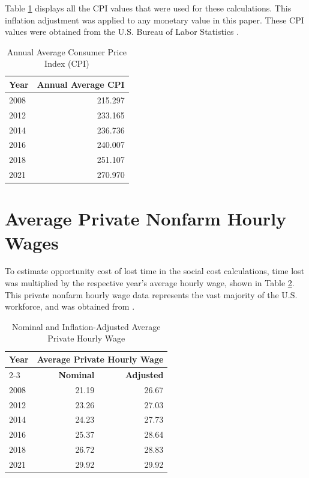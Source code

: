 Table \ref{tab:appendix_cpi} displays all the CPI values that were used for these calculations. This inflation adjustment was applied to any monetary value in this paper. These CPI values were obtained from the U.S. Bureau of Labor Statistics \cite{BLS_CPI, USInflationCalc_CPI}.

\begin{table}[ht]
\centering
\caption{Annual Average Consumer Price Index (CPI)}
\label{tab:appendix_cpi}
\begin{tabular}{lr}
\toprule
\textbf{Year} & \textbf{Annual Average CPI} \\
\midrule
2008 & 215.297 \\
2012 & 233.165 \\
2014 & 236.736 \\
2016 & 240.007 \\
2018 & 251.107 \\
2021 & 270.970 \\
\bottomrule
\end{tabular}
\end{table}

\section{Average Private Nonfarm Hourly Wages}
\label{app:hourly_wages}
To estimate opportunity cost of lost time in the social cost calculations, time lost was multiplied by the respective year's average hourly wage, shown in Table \ref{tab:appendix_wage}. This private nonfarm hourly wage data represents the vast majority of the U.S. workforce, and was obtained from \cite{FRED_Wage}.

\begin{table}[ht]
\centering
\caption{Nominal and Inflation-Adjusted Average Private Hourly Wage}
\label{tab:appendix_wage}
\begin{tabular}{lrr}
\toprule
\textbf{Year} & \multicolumn{2}{c}{\textbf{Average Private Hourly Wage}} \\
\cmidrule(lr){2-3} %
& \textbf{Nominal} & \textbf{Adjusted} \\
\midrule
2008 & 21.19 & 26.67 \\
2012 & 23.26 & 27.03 \\
2014 & 24.23 & 27.73 \\
2016 & 25.37 & 28.64 \\
2018 & 26.72 & 28.83 \\
2021 & 29.92 & 29.92 \\
\bottomrule
\end{tabular}
\end{table}


